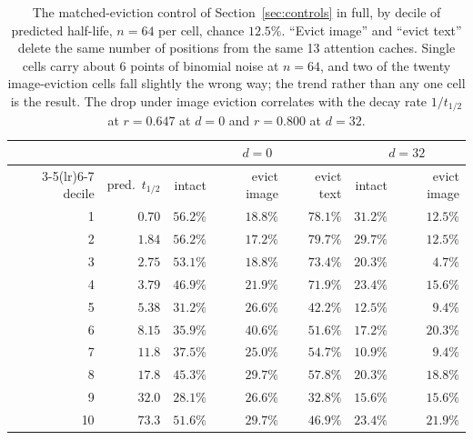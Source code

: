 \begin{table}[h]
\centering\small
\begin{tabular}{rrrrrrr}
\toprule
& & \multicolumn{3}{c}{$d = 0$} & \multicolumn{2}{c}{$d = 32$} \\
\cmidrule(lr){3-5}\cmidrule(lr){6-7}
decile & pred.\ $t_{1/2}$ & intact & evict image & evict text & intact & evict image \\
\midrule
1  & $0.70$ & $56.2\%$ & $18.8\%$ & $78.1\%$ & $31.2\%$ & $12.5\%$ \\
2  & $1.84$ & $56.2\%$ & $17.2\%$ & $79.7\%$ & $29.7\%$ & $12.5\%$ \\
3  & $2.75$ & $53.1\%$ & $18.8\%$ & $73.4\%$ & $20.3\%$ & $4.7\%$  \\
4  & $3.79$ & $46.9\%$ & $21.9\%$ & $71.9\%$ & $23.4\%$ & $15.6\%$ \\
5  & $5.38$ & $31.2\%$ & $26.6\%$ & $42.2\%$ & $12.5\%$ & $9.4\%$  \\
6  & $8.15$ & $35.9\%$ & $40.6\%$ & $51.6\%$ & $17.2\%$ & $20.3\%$ \\
7  & $11.8$ & $37.5\%$ & $25.0\%$ & $54.7\%$ & $10.9\%$ & $9.4\%$  \\
8  & $17.8$ & $45.3\%$ & $29.7\%$ & $57.8\%$ & $20.3\%$ & $18.8\%$ \\
9  & $32.0$ & $28.1\%$ & $26.6\%$ & $32.8\%$ & $15.6\%$ & $15.6\%$ \\
10 & $73.3$ & $51.6\%$ & $29.7\%$ & $46.9\%$ & $23.4\%$ & $21.9\%$ \\
\bottomrule
\end{tabular}
\caption{The matched-eviction control of Section~\ref{sec:controls} in full, by
decile of predicted half-life, $n = 64$ per cell, chance $12.5\%$. ``Evict
image'' and ``evict text'' delete the same number of positions from the same 13
attention caches. Single cells carry about $6$ points of binomial noise at
$n = 64$, and two of the twenty image-eviction cells fall slightly the wrong
way; the trend rather than any one cell is the result. The drop under image
eviction correlates with the decay rate $1/t_{1/2}$ at $r = 0.647$ at $d{=}0$
and $r = 0.800$ at $d{=}32$.}
\label{tab:controls_full}
\end{table}

